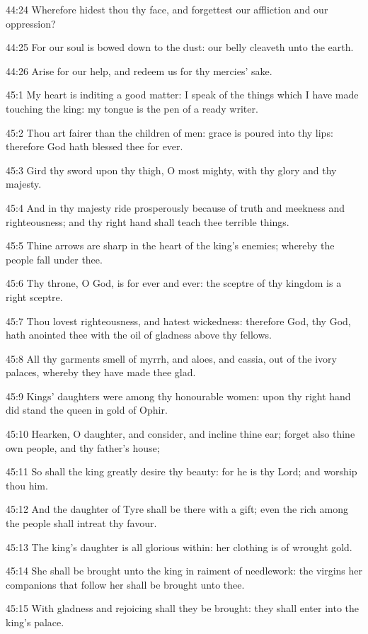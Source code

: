 44:24 Wherefore hidest thou thy face, and forgettest our affliction and our oppression?

44:25 For our soul is bowed down to the dust: our belly cleaveth unto the earth.

44:26 Arise for our help, and redeem us for thy mercies' sake.



45:1 My heart is inditing a good matter: I speak of the things which I have made touching the king: my tongue is the pen of a ready writer.

45:2 Thou art fairer than the children of men: grace is poured into thy lips: therefore God hath blessed thee for ever.

45:3 Gird thy sword upon thy thigh, O most mighty, with thy glory and thy majesty.

45:4 And in thy majesty ride prosperously because of truth and meekness and righteousness; and thy right hand shall teach thee terrible things.

45:5 Thine arrows are sharp in the heart of the king's enemies; whereby the people fall under thee.

45:6 Thy throne, O God, is for ever and ever: the sceptre of thy kingdom is a right sceptre.

45:7 Thou lovest righteousness, and hatest wickedness: therefore God, thy God, hath anointed thee with the oil of gladness above thy fellows.

45:8 All thy garments smell of myrrh, and aloes, and cassia, out of the ivory palaces, whereby they have made thee glad.

45:9 Kings' daughters were among thy honourable women: upon thy right hand did stand the queen in gold of Ophir.

45:10 Hearken, O daughter, and consider, and incline thine ear; forget also thine own people, and thy father's house;

45:11 So shall the king greatly desire thy beauty: for he is thy Lord; and worship thou him.

45:12 And the daughter of Tyre shall be there with a gift; even the rich among the people shall intreat thy favour.

45:13 The king's daughter is all glorious within: her clothing is of wrought gold.

45:14 She shall be brought unto the king in raiment of needlework: the virgins her companions that follow her shall be brought unto thee.

45:15 With gladness and rejoicing shall they be brought: they shall enter into the king's palace.

